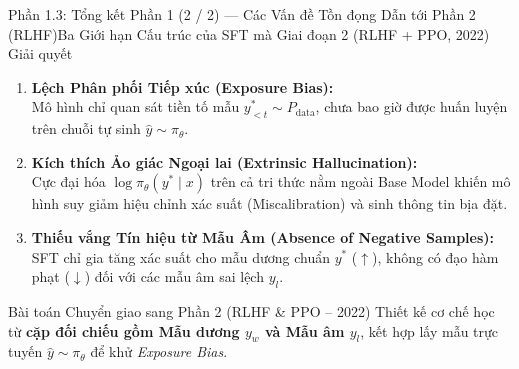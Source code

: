 \begin{frame}{Phần 1.3: Tổng kết Phần 1 (2 / 2) --- Các Vấn đề Tồn đọng Dẫn tới Phần 2 (RLHF)}{Ba Giới hạn Cấu trúc của SFT mà Giai đoạn 2 (RLHF + PPO, 2022) Giải quyết}
  \small
  \begin{enumerate}\setlength{\itemsep}{6pt}
    \item \textbf{Lệch Phân phối Tiếp xúc (Exposure Bias):}\\
      \footnotesize Mô hình chỉ quan sát tiền tố mẫu $y_{<t}^* \sim P_{\text{data}}$, chưa bao giờ được huấn luyện trên chuỗi tự sinh $\hat{y} \sim \pi_\theta$.
    \item \textbf{Kích thích Ảo giác Ngoại lai (Extrinsic Hallucination):}\\
      \footnotesize Cực đại hóa $\log \pi_\theta(y^* \mid x)$ trên cả tri thức nằm ngoài Base Model khiến mô hình suy giảm hiệu chỉnh xác suất (Miscalibration) và sinh thông tin bịa đặt.
    \item \textbf{Thiếu vắng Tín hiệu từ Mẫu Âm (Absence of Negative Samples):}\\
      \footnotesize SFT chỉ gia tăng xác suất cho mẫu dương chuẩn $y^*$ ($\uparrow$), không có đạo hàm phạt ($\downarrow$) đối với các mẫu âm sai lệch $y_l$.
  \end{enumerate}

  \vspace{0.06cm}
  \begin{exampleblock}{Bài toán Chuyển giao sang Phần 2 (RLHF \& PPO -- 2022)}
    \footnotesize
    Thiết kế cơ chế học từ \textbf{cặp đối chiếu gồm Mẫu dương $y_w$ và Mẫu âm $y_l$}, kết hợp lấy mẫu trực tuyến $\hat{y} \sim \pi_\theta$ để khử \textit{Exposure Bias}.
  \end{exampleblock}
\end{frame}
